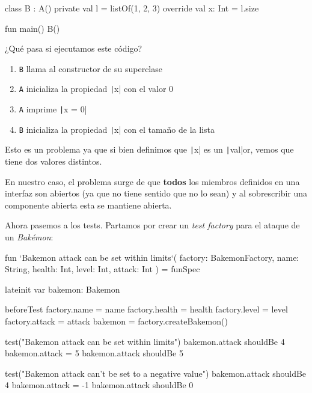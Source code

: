   \begin{kotlin}
    class B : A() {
      private val l = listOf(1, 2, 3)
      override val x: Int = l.size
    }
  \end{kotlin}

  \begin{kotlin}
    fun main() {
      B()
    }
  \end{kotlin}

  ¿Qué pasa si ejecutamos este código?
  
  \begin{enumerate}
    \item \texttt{B} llama al constructor de su superclase
    \item \texttt{A} inicializa la propiedad \texttt|x| con el valor 0
    \item \texttt{A} imprime \texttt|x = 0|
    \item \texttt{B} inicializa la propiedad \texttt|x| con el tamaño de la lista
  \end{enumerate}

  Esto es un problema ya que si bien definimos que \texttt|x| es un 
  \texttt|val|or, vemos que tiene dos valores distintos.

  En nuestro caso, el problema surge de que \textbf{todos} los miembros definidos en una interfaz
  son abiertos (ya que no tiene sentido que no lo sean) y al sobrescribir una componente abierta
  esta se mantiene abierta.

  Ahora pasemos a los tests.
  Partamos por crear un \textit{test factory} para el ataque de un \textit{Bakémon}:

  \begin{kotlin}
    fun `Bakemon attack can be set within limits`(
      factory: BakemonFactory,
      name: String, health: Int, level: Int, attack: Int
    ) = funSpec {
      lateinit var bakemon: Bakemon

      beforeTest {
        factory.name = name
        factory.health = health
        factory.level = level
        factory.attack = attack
        bakemon = factory.createBakemon()
      }

      test("Bakemon attack can be set within limits") {
        bakemon.attack shouldBe 4
        bakemon.attack = 5
        bakemon.attack shouldBe 5
      }

      test("Bakemon attack can't be set to a negative value") {
        bakemon.attack shouldBe 4
        bakemon.attack = -1
        bakemon.attack shouldBe 0
      }
    }
  \end{kotlin}

